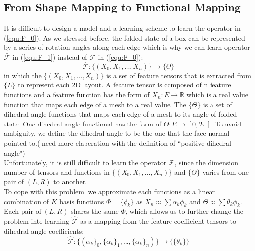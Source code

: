 \subsection{From Shape Mapping to Functional Mapping}
It is difficult to design a model and a learning scheme to learn the operator in (\ref{equ:F_0}). As we stressed before, the folded state of a box can be represented by a series of rotation angles along each edge which is why we can learn operator $\mathcal{\bar{F}}$ in (\ref{equ:F_1}) instead of $\mathcal{F}$ in (\ref{equ:F_0}):
\begin{equation}
\mathcal{\bar{F}}:\{(X_0,X_1,...,X_n)\}\rightarrow\{\Theta\}
\label{equ:F_1}
\end{equation}
in which the $\{(X_0,X_1,...,X_n)\}$ is a set of feature tensors that is extracted from $\{L\}$ to represent each 2D layout. A feature tensor is composed of n feature functions and a feature function has the form of $X_n:E\rightarrow\mathbb{R}$ which is a real value function that maps each edge of a mesh to a real value. The $\{\Theta\}$ is a set of dihedral angle functions that maps each edge of a mesh to its angle of folded state. One dihedral angle functional has the form of $\Theta:E\rightarrow [0,2\pi]$. To avoid ambiguity, we define the dihedral angle to be the one that the face normal pointed to.({\color{red} {need more elaberation with the definition of ``positive dihedral angle"}})\\
Unfortunately, it is still difficult to learn the operator $\mathcal{\bar{F}}$, since the dimension number of tensors and functions in $\{(X_0,X_1,...,X_n)\}$ and $\{\Theta\}$ varies from one pair of $(L,R)$ to another.\\
To cope with this problem, we approximate each functions as a linear combination of $K$ basis functions $\Phi = \{\phi_k\}$ as $X_n \approx \sum \alpha_k \phi_k$  and $\Theta \approx \sum \theta_k \phi_k$. Each pair of $(L,R)$ shares the same $\Phi$, which allows us to further change the problem into learning $\mathcal{\hat{F}}$ as a mapping from the feature coefficient tensors to dihedral angle coefficients:
\begin{equation}
\mathcal{\hat{F}}:\{(\alpha_k\}_0,\{\alpha_k\}_1,...,\{\alpha_k\}_n)\}\rightarrow\{\{\theta_k\}\}
\label{equ:F_2}
\end{equation}
